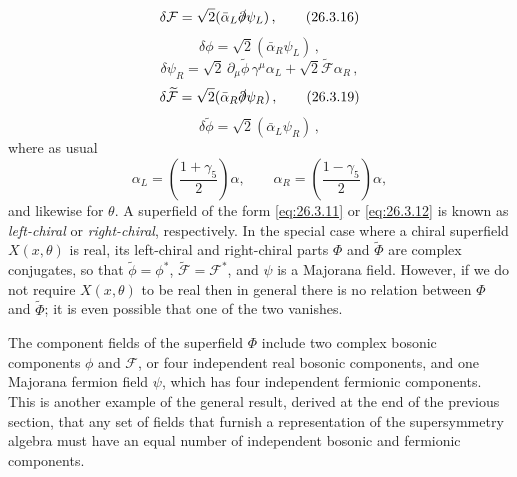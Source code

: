 \begin{equation}
  \delta\mathcal{F}
  =\sqrt{2}(\bar\alpha_L\sl{\partial}\psi_L)\,,
  \tag{26.3.16}\label{eq:26.3.16}
\end{equation}
\begin{equation}
  \delta\phi=\sqrt{2}(\bar\alpha_R\psi_L)\,,
  \tag{26.3.17}\label{eq:26.3.17}
\end{equation}
\begin{equation}
  \delta\psi_R
  =\sqrt{2}\,\partial_\mu\widetilde{\phi}\,\gamma^\mu\alpha_L
  +\sqrt{2}\widetilde{\mathcal{F}}\alpha_R\,,
  \tag{26.3.18}\label{eq:26.3.18}
\end{equation}
\begin{equation}
  \delta\widetilde{\mathcal{F}}
  =\sqrt{2}(\bar\alpha_R\sl{\partial}\psi_R)\,,
  \tag{26.3.19}\label{eq:26.3.19}
\end{equation}
\begin{equation}
  \delta\widetilde{\phi}=\sqrt{2}(\bar\alpha_L\psi_R)\,,
  \tag{26.3.20}\label{eq:26.3.20}
\end{equation}
where as usual
\[
  \alpha_L=\left(\frac{1+\gamma_5}{2}\right)\alpha,\qquad
  \alpha_R=\left(\frac{1-\gamma_5}{2}\right)\alpha,
\]
and likewise for $\theta$. A superfield of the form \eqref{eq:26.3.11} or
\eqref{eq:26.3.12} is known as \emph{left-chiral} or \emph{right-chiral},
respectively. In the special case where a chiral superfield $X(x,\theta)$ is
real, its left-chiral and right-chiral parts $\Phi$ and $\widetilde{\Phi}$ are
complex conjugates, so that $\widetilde{\phi}=\phi^*$,
$\widetilde{\mathcal{F}}=\mathcal{F}^*$, and $\psi$ is a Majorana field.
However, if we do not require $X(x,\theta)$ to be real then in general there
is no relation between $\Phi$ and $\widetilde{\Phi}$; it is even possible that
one of the two vanishes.

The component fields of the superfield $\Phi$ include two complex bosonic
components $\phi$ and $\mathcal{F}$, or four independent real bosonic
components, and one Majorana fermion field $\psi$, which has four independent
fermionic components. This is another example of the general result, derived
at the end of the previous section, that any set of fields that furnish a
representation of the supersymmetry algebra must have an equal number of
independent bosonic and fermionic components.


